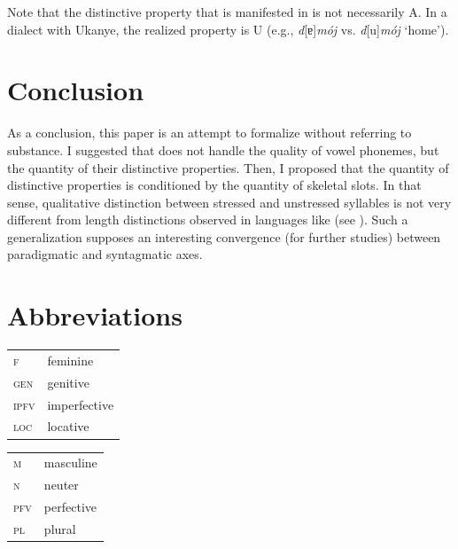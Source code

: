 \documentclass[output=paper,modfonts,newtxmath,hidelinks,]{langscibook}
\begin{document}
\noindent Note that the distinctive property that is manifested in  is not necessarily {\textbar}A{\textbar}. In a dialect with Ukanye, the realized property is {\textbar}U{\textbar} (e.g., \textit{d}[ɐ]\textit{mój} vs. \textit{d}[u]\textit{mój} ‘home’).

\section{Conclusion}\label{5:s5}

As a conclusion, this paper is an attempt to formalize   without referring to substance. I suggested that   does not handle the quality of vowel phonemes, but the quantity of their distinctive properties. Then, I proposed that the quantity of distinctive properties is conditioned by the quantity of skeletal slots. In that sense,  qualitative distinction between stressed and unstressed syllables is not very different from length distinctions observed in languages like  (see \citealt{Parmenter-Carman1932}). Such a generalization supposes an interesting convergence (for further studies) between paradigmatic and syntagmatic axes.


\section*{Abbreviations}

\begin{tabularx}{.5\textwidth}{@{}lQ@{}}
\textsc{f}&{feminine}\\
\textsc{gen}&{genitive}\\
\textsc{ipfv}&{imperfective}\\
\textsc{loc}&{locative}\\
\end{tabularx}%
\begin{tabularx}{.5\textwidth}{@{}lQ@{}}
\textsc{m}&{masculine}\\
\textsc{n}&{neuter}\\
\textsc{pfv}&{perfective}\\
\textsc{pl}&{plural}\\
\end{tabularx}

\sloppy
\printbibliography[heading=subbibliography,notkeyword=this]
\end{document}
